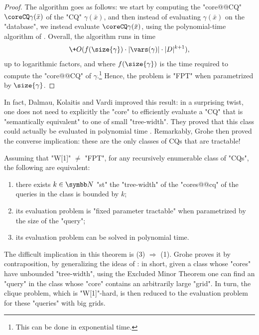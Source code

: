 \begin{proof}
	The algorithm goes as follows:
	we start by computing the "core@@CQ" $\coreCQ\gamma(\bar x)$
	of the "CQ" $\gamma(\bar x)$, and then instead of evaluating
	$\gamma(\bar x)$ on the "database", we instead evaluate
	$\coreCQ\gamma(\bar x)$, using the polynomial-time algorithm
	of .
	Overall, the algorithm runs in time
	\[
		\+O(f(\size{\gamma})\cdot|\vars(\gamma)|\cdot |D|^{k+1}),
	\]
	up to logarithmic factors, and where $f(\size{\gamma})$
	is the time required to compute the "core@@CQ" of
	$\gamma$.\footnote{This can be done in exponential time.}
	Hence, the problem is "FPT" when parametrized by $\size{\gamma}$.
\end{proof}

In fact, Dalmau, Kolaitis and Vardi improved this result: in a surprising twist, 
one does not need to explicitly the "core" to efficiently evaluate
a "CQ" that is "semantically equivalent" to one of small "tree-width".
They proved that this class could actually be evaluated in polynomial time
\cite[Corollary~5]{DalmauKolaitisVardi2002Constraint}.
Remarkably, Grohe then proved the converse implication: these 
are the only classes of CQs that are tractable!
\begin{proposition}
	Assuming that "W[1]" $\neq$ "FPT", for any recursively enumerable
	class of "CQs", the following are equivalent:
	\begin{enumerate}
		\item there exists $k\in\N$ "st" the "tree-width" of the "cores@@cq"
			of the queries in the class is bounded by $k$;
		\item its evaluation problem is "fixed parameter tractable"
			when parametrized by the size of the "query";
		\item its evaluation problem can be solved in polynomial time.
	\end{enumerate}
\end{proposition}
The difficult implication in this theorem is (3) $\Rightarrow$ (1).
Grohe proves it by contraposition, by generalizing
the ideas of \cite{GroheSchwentickSegoufin2001Evaluation}:
in short, given a class whose "cores" have unbounded "tree-width",
using the Excluded Minor Theorem \cite[$\ast$ (1.5)]{RobertsonSeymour1986GraphMinors5}
one can find an "query" in the class whose "core" 
contains an arbitrarily large "grid". In turn, the clique problem,
which is "W[1]"-hard, is then reduced to the evaluation problem
for these "queries" with big grids.

